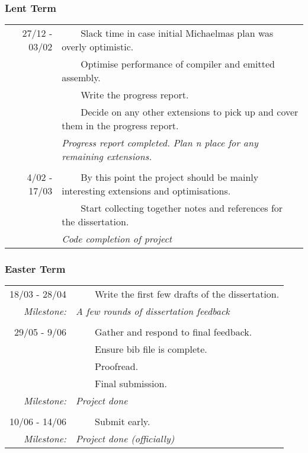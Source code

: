 \documentclass[12pt,a4paper, headings=standardclasses]{scrartcl}
\newcommand{\tabitem}{~~\llap{\textbullet}~~}
\begin{document}
\subsubsection*{Lent Term} 

\begin{tabularx}{\textwidth}{rX} \toprule
    27/12 - 03/02
    &\tabitem Slack time in case initial Michaelmas plan was overly optimistic. \\
    &\tabitem Optimise performance of compiler and emitted assembly. \\
    &\tabitem Write the progress report. \\
    &\tabitem Decide on any other extensions to pick up and cover them in the progress report. \\
    &\textit{Progress report completed. Plan n place for any remaining extensions.} \\

    &\\

    4/02 - 17/03
    &\tabitem By this point the project should be mainly interesting extensions and optimisations. \\
    &\tabitem Start collecting together notes and references for the dissertation. \\
    &\textit{Code completion of project} \\
\bottomrule
\end{tabularx}

\subsubsection*{Easter Term}

\begin{tabularx}{\textwidth}{rX} \toprule

    18/03 - 28/04
    &\tabitem Write the first few drafts of the dissertation. \\
    \textit{Milestone:}
    &\textit{A few rounds of dissertation feedback} \\

    &\\

    29/05 - 9/06
    &\tabitem Gather and respond to final feedback. \\
    &\tabitem Ensure bib file is complete. \\
    &\tabitem Proofread. \\
    &\tabitem Final submission. \\
    \textit{Milestone:}
    &\textit{Project done} \\

    &\\

    10/06 - 14/06
    &\tabitem Submit early. \\
    \textit{Milestone:}
    &\textit{Project done (officially)} \\
\bottomrule
\end{tabularx}
\end{document}
